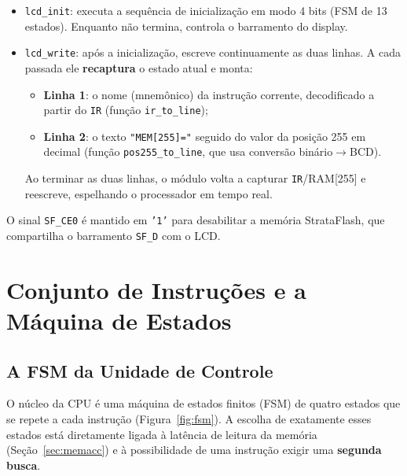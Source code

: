 \documentclass[12pt,a4paper]{article}
\begin{document}
\begin{itemize}
    \item \texttt{lcd\_init}: executa a sequência de inicialização em modo 4 bits (FSM
          de 13 estados). Enquanto não termina, controla o barramento do display.
    \item \texttt{lcd\_write}: após a inicialização, escreve continuamente as duas
          linhas. A cada passada ele \textbf{recaptura} o estado atual e monta:
          \begin{itemize}
              \item \textbf{Linha 1}: o nome (mnemônico) da instrução corrente, decodificado
                    a partir do \texttt{IR} (função \texttt{ir\_to\_line});
              \item \textbf{Linha 2}: o texto \texttt{"MEM[255]="} seguido do valor da
                    posição 255 em decimal (função \texttt{pos255\_to\_line}, que usa
                    conversão binário$\to$BCD).
          \end{itemize}
          Ao terminar as duas linhas, o módulo volta a capturar \texttt{IR}/RAM[255] e
          reescreve, espelhando o processador em tempo real.
\end{itemize}

O sinal \texttt{SF\_CE0} é mantido em \texttt{'1'} para desabilitar a memória StrataFlash,
que compartilha o barramento \texttt{SF\_D} com o LCD.

\section{Conjunto de Instruções e a Máquina de Estados}

\subsection{A FSM da Unidade de Controle}
\label{sec:fsm}

O núcleo da CPU é uma máquina de estados finitos (FSM) de quatro estados que se repete a
cada instrução (Figura~\ref{fig:fsm}). A escolha de exatamente esses estados está
diretamente ligada à latência de leitura da memória (Seção~\ref{sec:memacc}) e à
possibilidade de uma instrução exigir uma \textbf{segunda busca}.
\end{document}
